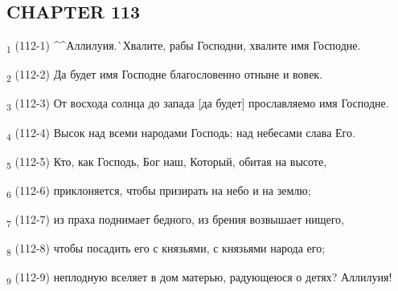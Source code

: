 \subsection{CHAPTER 113}
\begin{tcolorbox}
\textsubscript{1} (112-1) ^^Аллилуия.^^ Хвалите, рабы Господни, хвалите имя Господне.
\end{tcolorbox}
\begin{tcolorbox}
\textsubscript{2} (112-2) Да будет имя Господне благословенно отныне и вовек.
\end{tcolorbox}
\begin{tcolorbox}
\textsubscript{3} (112-3) От восхода солнца до запада [да будет] прославляемо имя Господне.
\end{tcolorbox}
\begin{tcolorbox}
\textsubscript{4} (112-4) Высок над всеми народами Господь; над небесами слава Его.
\end{tcolorbox}
\begin{tcolorbox}
\textsubscript{5} (112-5) Кто, как Господь, Бог наш, Который, обитая на высоте,
\end{tcolorbox}
\begin{tcolorbox}
\textsubscript{6} (112-6) приклоняется, чтобы призирать на небо и на землю;
\end{tcolorbox}
\begin{tcolorbox}
\textsubscript{7} (112-7) из праха поднимает бедного, из брения возвышает нищего,
\end{tcolorbox}
\begin{tcolorbox}
\textsubscript{8} (112-8) чтобы посадить его с князьями, с князьями народа его;
\end{tcolorbox}
\begin{tcolorbox}
\textsubscript{9} (112-9) неплодную вселяет в дом матерью, радующеюся о детях? Аллилуия!
\end{tcolorbox}
